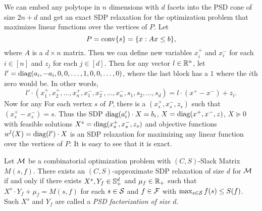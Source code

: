 \begin{example}
We can embed any polytope in $n$ dimensions with $d$ facets into the PSD cone of size $2n+d$ and get an exact SDP relaxation for the optimization problem that maximizes linear functions over the vertices of $P$. Let
\[P = \operatorname{conv}\{s\} = \{x: Ax \leq b\},\]
where $A$ is a $d \times n$ matrix. Then we can define new variables $x_i^+$ and $x_i^-$ for each $i \in [n]$ and $z_j$ for each $j \in [d]$. Then for any vector $l \in \mathbb R^n$, let $l' = \text{diag}(a_i,-a_i,0,0,\dots,1,0,0,\dots,0)$, where the last block has a $1$ where the $i$th zero would be. In other words, 
\[l' \cdot (x_1^+,x_2^+,\dots,x_n^+,x_1^-,x_2^-,\dots,x_n^-,s_1,s_2,\dots,s_d) = l \cdot (x^+ - x^-) + z_i.\]
Now for any For each vertex $s$ of $P$, there is a $(x_s^+,x_s^-,z_s)$ such that $(x_s^+ - x_s^-) = s$. Thus the SDP $\text{diag}(a_i') \cdot X = b_i$, $X = \text{diag}(x^+,x^-,z)$, $X \succeq 0$ with feasible solutions $X^s = \text{diag}(x_s^+,x_s^-,z_s)$ and objective functions $w^l(X) = \text{diag}(l') \cdot X$ is an SDP relaxation for maximizing any linear function over the vertices of $P$. It is easy to see that it is exact.

\end{example}
\begin{theorem}\label{thm:yannakakis}
Let $\mathcal M$ be a combinatorial optimization problem with $(C,S)$-Slack Matrix $M(s,f)$. There exists an $(C,S)$-approximate SDP relaxation of size $d$ for $\mathcal M$ if and only if there exists $X^s,Y_f \in \mathbb{S}^{d}_+$ and $\mu_f \in \mathbb R_+$ such that $X^s \cdot Y_f + \mu_f = M(s,f)$ for each $s \in \mathcal S $ and $f \in \mathcal F$ with $\max_{s \in \mathcal S} f(s) \leq S(f)$. Such $X^s$ and $Y_f$ are called a \emph{PSD factorization of size $d$}.
\end{theorem}
